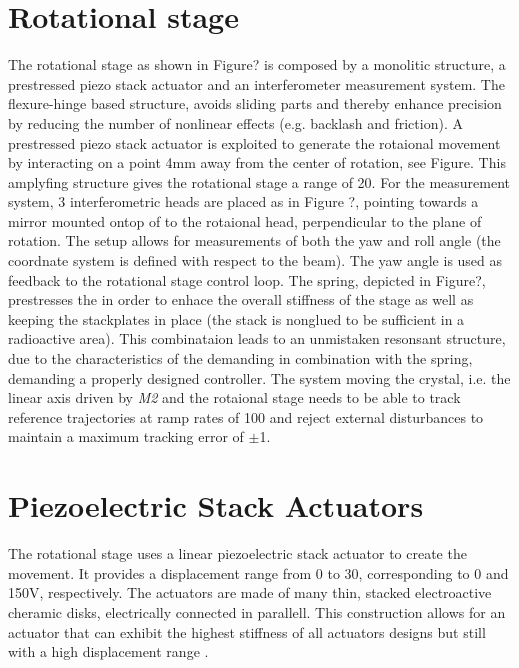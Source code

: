 \section{Rotational stage}
\label{sec:rotational_stage}
The rotational stage as shown in Figure? is composed by a monolitic structure, a prestressed piezo stack actuator and an interferometer measurement system. The flexure-hinge based structure, avoids sliding parts and thereby enhance precision by reducing the number of nonlinear effects (e.g. backlash and friction). A prestressed piezo stack actuator is exploited to generate the rotaional movement by interacting on a point 4mm away from the center of rotation, see Figure. This amplyfing structure gives the rotational stage a range of \unit{20}{\milli\rad}. For the measurement system, 3 interferometric heads are placed as in Figure ?, pointing towards a mirror mounted ontop of to the rotaional head, perpendicular to the plane of rotation. The setup allows for measurements of both the yaw and roll angle (the coordnate system is defined with respect to the beam). The yaw angle is used as feedback to the rotational stage control loop. The spring, depicted in Figure?, prestresses the \abbrPEA in order to enhace the overall stiffness of the stage as well as keeping the stackplates in place (the stack is nonglued to be sufficient in a radioactive area). This combinataion leads to an unmistaken resonsant structure, due to the characteristics of the \abbrPEA demanding in combination with the spring, demanding a properly designed controller. The system moving the crystal, i.e. the linear axis driven by \emph{M2} and the rotaional stage needs to be able to track reference trajectories at ramp rates of \unit{100}{\micro\radianpersecond} and reject external disturbances to maintain a maximum tracking error of $\pm$\unit{1}{\micro\rad}.

\section{Piezoelectric Stack Actuators}
The rotational stage uses a linear piezoelectric stack actuator to create the movement. It provides a displacement range from 0 to \unit{30}{\micro\meter}, corresponding to 0 and 150V, respectively. The actuators are made of many thin, stacked electroactive cheramic disks, electrically connected in parallell. This construction allows for an actuator that can exhibit the highest stiffness of all actuators designs but still with a high displacement range \cite{Piezo:2008}.

